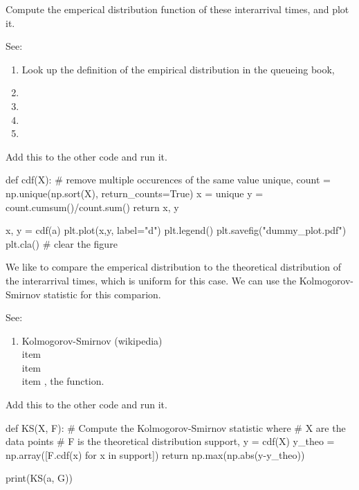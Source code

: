 \documentclass{scrartcl}
\begin{document}
\begin{exercise}
Compute  the emperical distribution function of these interarrival times, and plot it.

See:
\begin{enumerate}
\item Look up the definition of the empirical distribution in the queueing book,
\item {}
\item {}
\item {}
\item {}
\end{enumerate}
\begin{solution}
Add this to the other code and run it.
\begin{pyverbatim}
def cdf(X):
    # remove multiple occurences of the same value
    unique, count = np.unique(np.sort(X), return_counts=True)
    x = unique
    y = count.cumsum()/count.sum()
    return x, y

x, y = cdf(a)
plt.plot(x,y,  label="d")
plt.legend()
plt.savefig("dummy_plot.pdf")
plt.cla() # clear the figure
\end{pyverbatim}
\end{solution}
\end{exercise}

\begin{exercise}
We like to compare the emperical distribution to the theoretical distribution of the interarrival times, which is uniform for this case. We can use the Kolmogorov-Smirnov statistic for this comparion. 

See:
\begin{enumerate}
\item Kolmogorov-Smirnov (wikipedia)
\\item {}
\\item {}
\\item {}, the  function.
\end{enumerate}

\begin{solution}
Add this to the other code and run it.
\begin{pyverbatim}
def KS(X, F):
    # Compute the Kolmogorov-Smirnov statistic where
    # X are the data points
    # F is the theoretical distribution
    support, y = cdf(X)
    y_theo = np.array([F.cdf(x) for x in support])
    return np.max(np.abs(y-y_theo))

print(KS(a, G))    
\end{pyverbatim}
\end{solution}
\end{exercise}
\end{document}
